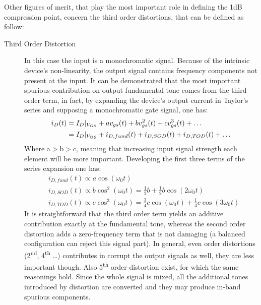 Other figures of merit, that play the most important role in defining the 1dB compression point, concern the third order distortions, that can be defined as follow:
\begin{description}
	\item [Third Order Distortion] In this case the input is a monochromatic signal. Because of the intrinsic device's non-linearity, the output signal contains frequency components not present at the input. It can be demonstrated that the most important spurious contribution on output fundamental tone comes from the third order term, in fact, by expanding the device's output current in Taylor's series and supposing a monochromatic gate signal, one has:
	\begin{align}
		i_D(t) &= I_D|_{V_{GS}}+av_{gs}(t)+bv_{gs}^2(t)+cv_{gs}^3(t)+\dots \notag \\
		&=I_D|_{V_{GS}}+i_{D,fund}(t)+i_{D,SOD}(t)+	i_{D,TOD}(t)+\dots
	\end{align}
	Where a$>$b$>$c, meaning that increasing input signal strength each element will be more important. Developing the first three terms of the series expansion one has:
	\begin{align}
	&i_{D,fund}(t) \propto a\cos(\omega_0 t) \\
	&i_{D,SOD}(t) \propto b\cos^2(\omega_0 t) =\frac{1}{2}b+\frac{1}{2}b\cos(2\omega_0 t) \\
	&i_{D,TOD}(t) \propto c\cos^3(\omega_0 t) = \frac{3}{4}c\cos(\omega_0 t) +\frac{1}{4}c\cos(3\omega_0 t)
	\end{align} 
	It is straightforward that the third order term yields an additive contribution exactly at the fundamental tone, whereas the second order distortion adds a zero-frequency term that is not damaging (a balanced configuration can reject this signal part). In general, even order distortions (2\textsuperscript{nd}, 4\textsuperscript{th} \dots) contributes in corrupt the output signals as well, they are less important though. Also 5\textsuperscript{th} order distortion exist, for which the same reasonings hold. Since the whole signal is mixed, all the additional tones introduced by distortion are converted and they may produce in-band spurious components.
	

\end{description}
